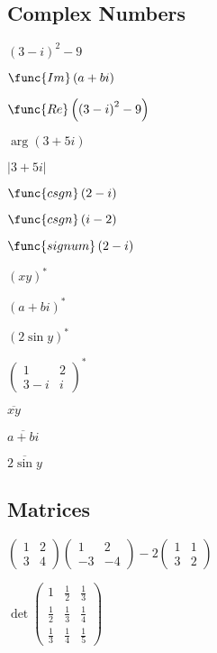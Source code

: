 \documentclass{article}
\begin{document}
\subsection{Complex Numbers}

$\left( 3-i\right) ^{2}-9$

$\func{Im}\left( a+bi\right) $

$\func{Re}\left( \left( 3-i\right) ^{2}-9\right) $

$\arg \left( 3+5i\right) $

$\left\vert 3+5i\right\vert $

$\func{csgn}\left( 2-i\right) $

$\func{csgn}\left( i-2\right) $

$\func{signum}\left( 2-i\right) $

$\left( xy\right) ^{\ast }$

$\left( a+bi\right) ^{\ast }$

$\left( 2\sin y\right) ^{\ast }$

$\left( 
\begin{array}{cc}
1 & 2 \\ 
3-i & i%
\end{array}%
\right) ^{\ast }$

$\overline{xy}$

$\overline{a+bi}$

$\overline{2\sin y}$

\subsection{Matrices}

$\left( 
\begin{array}{cc}
1 & 2 \\ 
3 & 4%
\end{array}%
\right) \left( 
\begin{array}{cc}
1 & 2 \\ 
-3 & -4%
\end{array}%
\right) -2\left( 
\begin{array}{cc}
1 & 1 \\ 
3 & 2%
\end{array}%
\right) $

$\det \left( 
\begin{array}{ccc}
1 & \frac{1}{2} & \frac{1}{3} \\ 
\frac{1}{2} & \frac{1}{3} & \frac{1}{4} \\ 
\frac{1}{3} & \frac{1}{4} & \frac{1}{5}%
\end{array}%
\right) $
\end{document}
